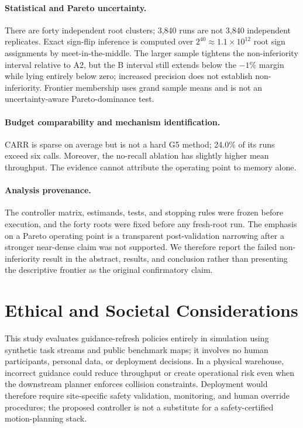 \documentclass[sigconf,review,anonymous]{acmart}
\newcommand{\carr}{\textsc{CARR}\xspace}
\begin{document}
\paragraph{Statistical and Pareto uncertainty.}
There are forty independent root clusters; 3{,}840 runs are not 3{,}840
independent replicates. Exact sign-flip inference is computed over
$2^{40}\approx1.1\times10^{12}$ root sign assignments by meet-in-the-middle.
The larger sample tightens the non-inferiority interval relative to A2, but the
B interval still extends below the $-1\%$ margin while lying entirely below
zero; increased precision does not establish non-inferiority. Frontier
membership uses grand sample means and is not an uncertainty-aware
Pareto-dominance test.

\paragraph{Budget comparability and mechanism identification.}
\carr is sparse on average but is not a hard G5 method; 24.0\% of its runs
exceed six calls. Moreover, the no-recall ablation has slightly higher mean
throughput. The evidence cannot attribute the operating point to memory alone.

\paragraph{Analysis provenance.}
The controller matrix, estimands, tests, and stopping rules were frozen
before execution, and the forty roots were fixed before any fresh-root run. The
emphasis on a Pareto operating point is a transparent post-validation narrowing
after a stronger near-dense claim was not supported. We therefore report the
failed non-inferiority result in the abstract, results, and conclusion rather
than presenting the descriptive frontier as the original confirmatory claim.

\section*{Ethical and Societal Considerations}

This study evaluates guidance-refresh policies entirely in simulation using
synthetic task streams and public benchmark maps; it involves no human
participants, personal data, or deployment decisions. In a physical warehouse,
incorrect guidance could reduce throughput or create operational risk even
when the downstream planner enforces collision constraints. Deployment would
therefore require site-specific safety validation, monitoring, and human
override procedures; the proposed controller is not a substitute for a
safety-certified motion-planning stack.
\end{document}
